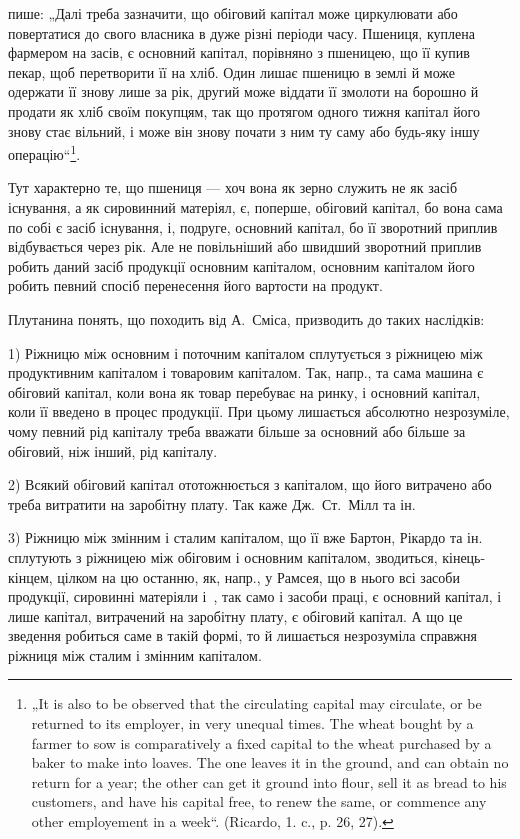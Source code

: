 \parcont{}  %
пише: „Далі треба зазначити, що обіговий капітал може циркулювати
або повертатися до свого власника в дуже різні періоди часу. Пшениця,
куплена фармером на засів, є основний капітал, порівняно з пшеницею,
що її купив пекар, щоб перетворити її на хліб. Один лишає пшеницю
в землі й може одержати її знову лише за рік, другий може віддати її
змолоти на борошно й продати як хліб своїм покупцям, так що протягом
одного тижня капітал його знову стає вільний, і може він знову почати
з ним ту саму або будь-яку іншу операцію“\footnote{
„It is also to be observed that the circulating capital may circulate, or be
returned to its employer, in very unequal times. The wheat bought by a farmer to
sow is comparatively a fixed capital to the wheat purchased by a baker to make
into loaves. The one leaves it in the ground, and can obtain no return for a year; the
other can get it ground into flour, sell it as bread to his customers, and have his capital
free, to renew the same, or commence any other employement in a week“. (Ricardo,
1. c., p. 26, 27).
}.

Тут характерно те, що пшениця — хоч вона як зерно служить не як
засіб існування, а як сировинний матеріял, є, поперше, обіговий капітал,
бо вона сама по собі є засіб існування, і, подруге, основний капітал, бо
її зворотний приплив відбувається через рік. Але не повільніший або
швидший зворотний приплив робить даний засіб продукції основним капіталом,
основним капіталом його робить певний спосіб перенесення його
вартости на продукт.

Плутанина понять, що походить від А.~Сміса, призводить до таких
наслідків:

1) Ріжницю між основним і поточним капіталом сплутується з ріжницею
між продуктивним капіталом і товаровим капіталом. Так, напр.,
та сама машина є обіговий капітал, коли вона як товар перебуває на
ринку, і основний капітал, коли її введено в процес продукції. При
цьому лишається абсолютно незрозуміле, чому певний рід капіталу треба
вважати більше за основний або більше за обіговий, ніж інший, рід капіталу.

2) Всякий обіговий капітал ототожнюється з капіталом, що його витрачено
або треба витратити на заробітну плату. Так каже Дж.~Ст.~Мілл та ін.

3) Ріжницю між змінним і сталим капіталом, що її вже Бартон, Рікардо
та ін. сплутують з ріжницею між обіговим і основним капіталом, зводиться,
кінець-кінцем, цілком на цю останню, як, напр., у Рамсея, що в нього
всі засоби продукції, сировинні матеріяли і~, так само і засоби праці,
є основний капітал, і лише капітал, витрачений на заробітну плату, є
обіговий капітал. А що це зведення робиться саме в такій формі, то й
лишається незрозуміла справжня ріжниця між сталим і змінним капіталом.


